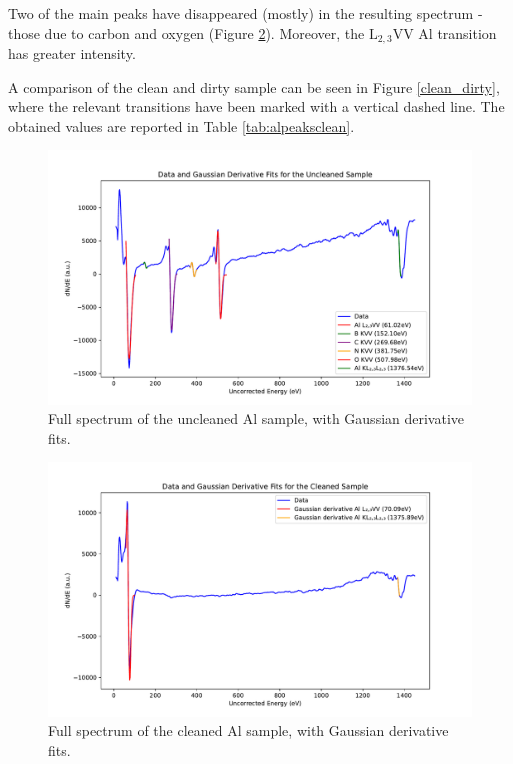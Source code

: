 \documentclass[12pt]{article}
\begin{document}
Two of the main peaks have disappeared (mostly) in the resulting spectrum - those due to carbon and oxygen (Figure \ref{cleaned}). Moreover, the $\text{L}_{2,3}\text{VV}$ Al transition has greater intensity.



A comparison of the clean and dirty sample can be seen in Figure \ref{clean_dirty}, where the relevant transitions have been marked with a vertical dashed line. The obtained values are reported in Table \ref{tab:alpeaksclean}.

\begin{figure}
  \includegraphics[width=\linewidth]{dirty.pdf}
  \caption{Full spectrum of the uncleaned Al sample, with Gaussian derivative fits.}
  \label{uncleaned}
\end{figure}

\begin{figure}
  \includegraphics[width=\linewidth]{cleaned.pdf}
  \caption{Full spectrum of the cleaned Al sample, with Gaussian derivative fits.}
  \label{cleaned}
\end{figure}
\end{document}
